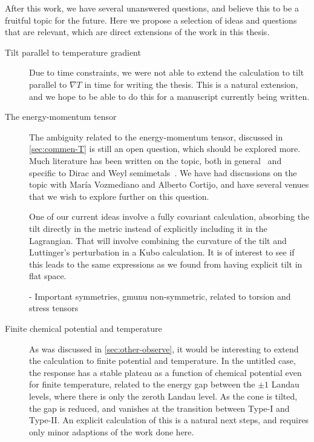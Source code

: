 After this work, we have several unanswered questions, and believe this to be a fruitful topic for the future.
Here we propose a selection of ideas and questions that are relevant, which are direct extensions of the work in this thesis.
\begin{description}
  \item[Tilt parallel to temperature gradient]
        Due to time constraints, we were not able to extend the calculation to tilt parallel to \( \nabla T \) in time for writing the thesis.
        This is a natural extension, and we hope to be able to do this for a manuscript currently being written.

  \item[The energy-momentum tensor]
        The ambiguity related to the energy-momentum tensor, discussed in \cref{sec:commen-T} is still an open question, which should be explored more.
        Much literature has been written on the topic, both in general~\cite{forgerCurrentsEnergyMomentumTensor2004} and specific to Dirac and Weyl semimetals~\cite{vanderwurffMagnetovorticalThermoelectricTransport2019,arjonaFingerprintsConformalAnomaly2019}.
        We have had discussions on the topic with María Vozmediano and Alberto Cortijo, and have several venues that we wish to explore further on this question.

        One of our current ideas involve a fully covariant calculation, absorbing the tilt directly in the metric instead of explicitly including it in the Lagrangian.
        That will involve combining the curvature of the tilt and Luttinger's perturbation in a Kubo calculation.
        It is of interest to see if this leads to the same expressions as we found from having explicit tilt in flat space.

        - Important symmetries, gmunu non-symmetric, related to torsion and stress tensors

  \item[Finite chemical potential and temperature]
        As was discussed in \cref{sec:other-observe}, it would be interesting to extend the calculation to finite potential and temperature.
        In the untitled case, the response has a stable plateau as a function of chemical potential even for finite temperature, related to the energy gap between the \( \pm 1 \) Landau levels, where there is only the zeroth Landau level.
        As the cone is tilted, the gap is reduced, and vanishes at the transition between Type-I and Type-II.
        An explicit calculation of this is a natural next steps, and requires only minor adaptions of the work done here.

\end{description}
